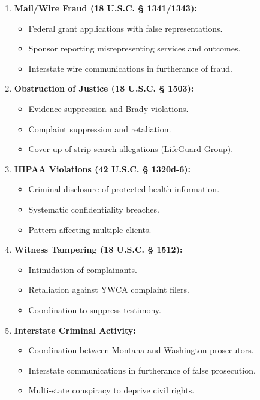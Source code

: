 \documentclass[12pt,oneside]{article}
\begin{document}
\begin{flushleft}
\begin{enumerate}
\item \textbf{Mail/Wire Fraud (18 U.S.C. § 1341/1343):}
  \begin{itemize}
  \item Federal grant applications with false representations.
  \item Sponsor reporting misrepresenting services and outcomes.
  \item Interstate wire communications in furtherance of fraud.
  \end{itemize}
\item \textbf{Obstruction of Justice (18 U.S.C. § 1503):}
  \begin{itemize}
  \item Evidence suppression and Brady violations.
  \item Complaint suppression and retaliation.
  \item Cover-up of strip search allegations (LifeGuard Group).
  \end{itemize}
\item \textbf{HIPAA Violations (42 U.S.C. § 1320d-6):}
  \begin{itemize}
  \item Criminal disclosure of protected health information.
  \item Systematic confidentiality breaches.
  \item Pattern affecting multiple clients.
  \end{itemize}
\item \textbf{Witness Tampering (18 U.S.C. § 1512):}
  \begin{itemize}
  \item Intimidation of complainants.
  \item Retaliation against YWCA complaint filers.
  \item Coordination to suppress testimony.
  \end{itemize}
\item \textbf{Interstate Criminal Activity:}
  \begin{itemize}
  \item Coordination between Montana and Washington prosecutors.
  \item Interstate communications in furtherance of false prosecution.
  \item Multi-state conspiracy to deprive civil rights.
  \end{itemize}
\end{enumerate}


\end{flushleft}
\end{document}

